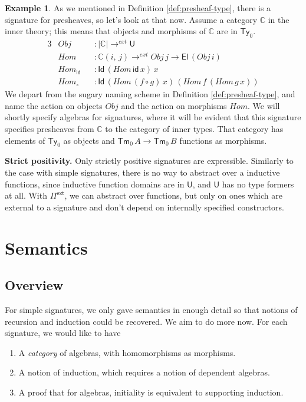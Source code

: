 \documentclass[12pt,a4paper,twoside,openany]{book}
\theoremstyle{remark}
\theoremstyle{definition}
\newtheorem{myexample}{Example}
\theoremstyle{theorem}
\newcommand{\mi}[1]{\mathit{#1}}
\newcommand{\ms}[1]{\mathsf{#1}}
\newcommand{\mbb}[1]{\mathbb{#1}}
\newcommand{\id}{\mathsf{id}}
\newcommand{\Tm}{\mathsf{Tm}}
\newcommand{\Ty}{\mathsf{Ty}}
\newcommand{\U}{\mathsf{U}}
\newcommand{\El}{\mathsf{El}}
\newcommand{\Id}{\mathsf{Id}}
\newcommand{\Pie}{\Pi^{\mathsf{ext}}}
\newcommand{\toe}{\to^{ext}}
\newcommand{\mbbC}{\mbb{C}}
\begin{document}
\begin{myexample}
As we mentioned in Definition \ref{def:presheaf-type}, there is a signature for
presheaves, so let's look at that now. Assume a category $\mbbC$ in the inner
theory; this means that objects and morphisms of $\mbbC$ are in $\Ty_0$.
\begin{alignat*}{3}
  & \mi{Obj}         &&: |\mbbC| \toe \U\\
  & \mi{Hom}         &&: \mbbC(i,\,j) \toe \mi{Obj}\,j \to \El\,(\mi{Obj}\,i)\\
  & \mi{Hom_{\ms{id}}} &&: \Id\,(\mi{Hom}\,\id\,x)\,x\\
  & \mi{Hom_{\circ}}  &&: \Id\,(\mi{Hom}\,(f \circ g)\,x)\,(\mi{Hom}\,f\,(\mi{Hom}\,g\,x))
\end{alignat*}
We depart from the sugary naming scheme in Definition \ref{def:presheaf-type},
and name the action on objects $\mi{Obj}$ and the action on morphisms
$\mi{Hom}$.  We will shortly specify algebras for signatures, where it will be
evident that this signature specifies presheaves from $\mbbC$ to the category
of inner types. That category has elements of $\Ty_0$ as objects and $\Tm_0\,A
\to \Tm_0\,B$ functions as morphisms.
\end{myexample}

\textbf{Strict positivity.} Only strictly positive signatures are expressible.
Similarly to the case with simple signatures, there is no way to abstract over a
inductive functions, since inductive function domains are in $\U$, and $\U$ has
no type formers at all. With $\Pie$, we can abstract over functions, but only on
ones which are external to a signature and don't depend on internally specified
constructors.

\section{Semantics}
\label{sec:fqiit-semantics}

\subsection{Overview}

For simple signatures, we only gave semantics in enough detail so that notions
of recursion and induction could be recovered. We aim to do more now. For each
signature, we would like to have
\begin{enumerate}
  \item A \emph{category} of algebras, with homomorphisms as morphisms.
  \item A notion of induction, which requires a notion of dependent algebras.
  \item A proof that for algebras, initiality is equivalent to supporting induction.
\end{enumerate}
\end{document}
